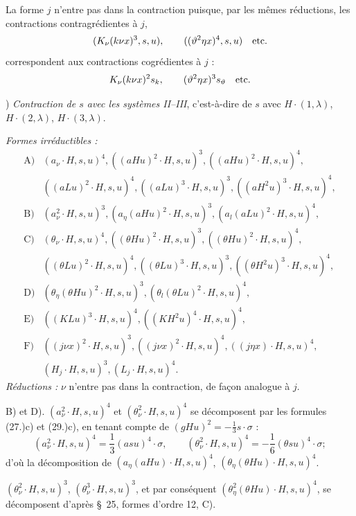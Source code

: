 \documentclass[11pt]{article}
\begin{document}
La forme $j$ n'entre pas dans la contraction puisque, par les mêmes réductions, les contractions contragrédientes à $j$,
\[
(K_\nu(k\nu x)^3,s,u),\qquad ((\vartheta^2\eta x)^4,s,u)\quad\hbox{etc.}
\]
correspondent aux contractions cogrédientes à $j$ :
\[
K_\nu(k\nu x)^2s_k,
\qquad (\vartheta^2\eta x)^3s_\vartheta\quad\hbox{etc.}
\]

) \emph{Contraction de $s$ avec les systèmes II--III}, c'est-à-dire de $s$ avec $H\cdot(1,\lambda)$, $H\cdot(2,\lambda)$, $H\cdot(3,\lambda)$.

\noindent\emph{Formes irréductibles :}
\[
\begin{array}{rl}
\text{A)}&(a_\nu\cdot H,s,u)^4,
((aHu)^2\cdot H,s,u)^3,
((aHu)^2\cdot H,s,u)^4,\\[0.25em]
&((aLu)^2\cdot H,s,u)^4,
((aLu)^3\cdot H,s,u)^3,
((aH^2u)^3\cdot H,s,u)^4,\\[0.45em]
\text{B)}&(a_\nu^2\cdot H,s,u)^3,
(a_\eta(aHu)^2\cdot H,s,u)^3,
(a_l(aLu)^2\cdot H,s,u)^4,\\[0.45em]
\text{C)}&(\theta_\nu\cdot H,s,u)^4,
((\theta Hu)^2\cdot H,s,u)^3,
((\theta Hu)^2\cdot H,s,u)^4,\\[0.25em]
&((\theta Lu)^2\cdot H,s,u)^4,
((\theta Lu)^3\cdot H,s,u)^3,
((\theta H^2u)^3\cdot H,s,u)^4,\\[0.45em]
\text{D)}&(\theta_\eta(\theta Hu)^2\cdot H,s,u)^3,
(\theta_l(\theta Lu)^2\cdot H,s,u)^4,\\[0.45em]
\text{E)}&((KLu)^3\cdot H,s,u)^4,
((KH^2u)^4\cdot H,s,u)^4,\\[0.45em]
\text{F)}&((j\nu x)^2\cdot H,s,u)^3,
((j\nu x)^2\cdot H,s,u)^4,
((j\eta x)\cdot H,s,u)^4,\\[0.25em]
&(H_j\cdot H,s,u)^3,
(L_j\cdot H,s,u)^4.
\end{array}
\]
\noindent\emph{Réductions :} $\nu$ n'entre pas dans la contraction, de façon analogue à $j$.

B) et D). $(a_\nu^2\cdot H,s,u)^4$ et $(\theta_\nu^2\cdot H,s,u)^4$ se décomposent par les formules (27.)c) et (29.)c), en tenant compte de $(gHu)^2=-\frac13s\cdot\sigma$ :
\[
(a_\nu^2\cdot H,s,u)^4=\frac13(asu)^4\cdot\sigma,
\qquad
(\theta_\nu^2\cdot H,s,u)^4=-\frac16(\theta su)^4\cdot\sigma;
\]
d'où la décomposition de $(a_\eta(aHu)\cdot H,s,u)^4$, $(\theta_\eta(\theta Hu)\cdot H,s,u)^4$.

$(\theta_\nu^2\cdot H,s,u)^3$, $(\theta_\nu^3\cdot H,s,u)^3$, et par conséquent $(\theta_\eta^2(\theta Hu)\cdot H,s,u)^4$, se décomposent d'après \S\ 25, formes d'ordre 12, C).
\end{document}
